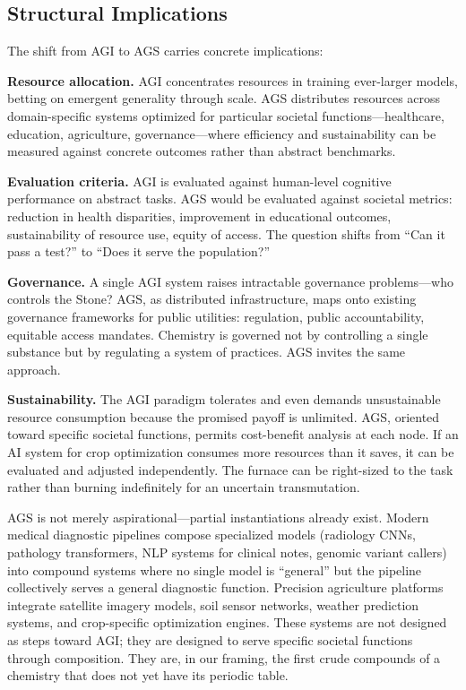 \documentclass[12pt]{article}
\begin{document}
\subsection{Structural Implications}
\label{sec:implications}

The shift from AGI to AGS carries concrete implications:

\textbf{Resource allocation.} AGI concentrates resources in training ever-larger models, betting on emergent generality through scale. AGS distributes resources across domain-specific systems optimized for particular societal functions---healthcare, education, agriculture, governance---where efficiency and sustainability can be measured against concrete outcomes rather than abstract benchmarks.

\textbf{Evaluation criteria.} AGI is evaluated against human-level cognitive performance on abstract tasks. AGS would be evaluated against societal metrics: reduction in health disparities, improvement in educational outcomes, sustainability of resource use, equity of access. The question shifts from ``Can it pass a test?'' to ``Does it serve the population?''

\textbf{Governance.} A single AGI system raises intractable governance problems---who controls the Stone? AGS, as distributed infrastructure, maps onto existing governance frameworks for public utilities: regulation, public accountability, equitable access mandates. Chemistry is governed not by controlling a single substance but by regulating a system of practices. AGS invites the same approach.

\textbf{Sustainability.} The AGI paradigm tolerates and even demands unsustainable resource consumption because the promised payoff is unlimited. AGS, oriented toward specific societal functions, permits cost-benefit analysis at each node. If an AI system for crop optimization consumes more resources than it saves, it can be evaluated and adjusted independently. The furnace can be right-sized to the task rather than burning indefinitely for an uncertain transmutation.

AGS is not merely aspirational---partial instantiations already exist. Modern medical diagnostic pipelines compose specialized models (radiology CNNs, pathology transformers, NLP systems for clinical notes, genomic variant callers) into compound systems where no single model is ``general'' but the pipeline collectively serves a general diagnostic function. Precision agriculture platforms integrate satellite imagery models, soil sensor networks, weather prediction systems, and crop-specific optimization engines. These systems are not designed as steps toward AGI; they are designed to serve specific societal functions through composition. They are, in our framing, the first crude compounds of a chemistry that does not yet have its periodic table.
\end{document}
